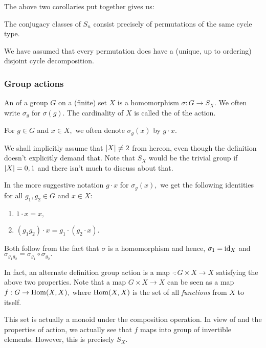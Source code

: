 The above two corollaries put together gives us:
\begin{thm} \label{thm:descconjclassSn}
	The conjugacy classes of $S_n$ consist precisely of permutations of the same cycle type.
\end{thm}

\begin{rem}
	We have assumed that every permutation does have a (unique, up to ordering) disjoint cycle decomposition.
\end{rem}

\subsubsection{Group actions} \label{subsubsec:groupactions}

\begin{defn}%
	An  of a group $G$ on a (finite) set $X$ is a homomorphism $\sigma : G \to S_X.$ We often write $\sigma_g$ for $\sigma(g).$ The cardinality of $X$ is called the  of the action.

	For $g \in G$ and $x \in X,$ we often denote $\sigma_g(x)$ by $g \cdot x.$ 
\end{defn}

\begin{rem}
	We shall implicitly assume that ${\left\lvert X \right\lvert} \neq 2$ from hereon, even though the definition doesn't explicitly demand that. Note that $S_X$ would be the trivial group if ${\left\lvert X \right\lvert} = 0, 1$ and there isn't much to discuss about that.
\end{rem}

\begin{rem}
	In the more suggestive notation $g \cdot x$ for $\sigma_g(x),$ we get the following identities for all $g_1, g_2 \in G$ and $x \in X$:
	\begin{enumerate}
		\item $1 \cdot x = x,$
		\item $(g_1g_2) \cdot x = g_1 \cdot (g_2 \cdot x).$
	\end{enumerate}
	Both follow from the fact that $\sigma$ is a homomorphism and hence, $\sigma_1 = \operatorname{id}_X$ and $\sigma_{g_1g_2} = \sigma_{g_1} \circ \sigma_{g_2}.$
\end{rem}

\begin{rem}
	In fact, an alternate definition group action is a map $\cdot : G \times X \to X$ satisfying the above two properties. Note that a map $G \times X \to X$ can be seen as a map $f : G \to \operatorname{Hom}(X, X),$ where $\operatorname{Hom}(X, X)$ is the set of all \emph{functions} from $X$ to itself.

	This set is actually a monoid under the composition operation. In view of  and the properties of action, we actually see that $f$ maps into group of invertible elements. However, this is precisely $S_X.$
\end{rem}

